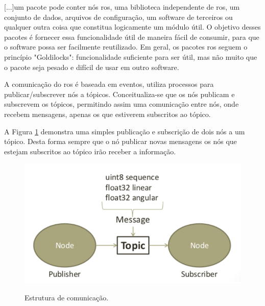 \begin{quoting}[rightmargin=0cm,leftmargin=4cm]
	\begin{singlespace}
		{\footnotesize
			[...]um pacote pode conter nós \gls*{ros}, uma biblioteca independente de \gls*{ros}, um conjunto de dados, arquivos de configuração, um software de terceiros ou qualquer outra coisa que constitua logicamente um módulo útil. O objetivo desses pacotes é fornecer essa funcionalidade útil de maneira fácil de consumir, para que o software possa ser facilmente reutilizado. Em geral, os pacotes \gls*{ros} seguem o princípio "Goldilocks": funcionalidade suficiente para ser útil, mas não muito que o pacote seja pesado e difícil de usar em outro software. \cite[tradução nossa]{rospackages}
		}
	\end{singlespace}
\end{quoting}


A comunicação do \gls*{ros} é baseada em eventos, utiliza processos para publicar/subscrever nós a tópicos. Conceitualiza-se que os nós publicam e subscrevem os tópicos, permitindo assim uma comunicação entre nós, onde recebem mensagens, apenas os que estiverem subscritos ao tópico.

A Figura \ref{fig:estrutura_comunicacao_ros} demonstra uma simples publicação e subscrição de dois nós a um tópico. Desta forma sempre que o nó publicar novas mensagens os nós que estejam subscritos ao tópico irão receber a informação.

\begin{figure}[H]
	\centering
	\caption{Estrutura de comunicação.}
	\includegraphics[width=1\textwidth]
	{Figures/estrutura_comunicacao_ros}
	\label{fig:estrutura_comunicacao_ros}
\end{figure}

